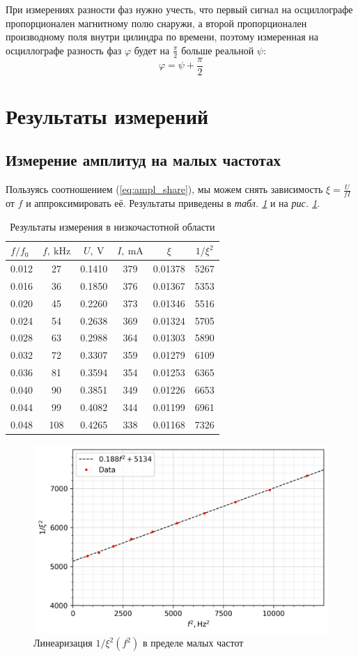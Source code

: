 \documentclass[12pt, a4paper]{article}
\newcommand{\V}{~\mathrm{V}}
\newcommand{\mA}{~\mathrm{mA}}
\newcommand{\kHz}{~\mathrm{kHz}}
\begin{document}
При измерениях разности фаз нужно учесть, что первый сигнал на осциллографе
пропорционален магнитному полю снаружи, а второй пропорционален производному
поля внутри цилиндра по времени, поэтому измеренная на осциллографе разность фаз $\varphi$ будет на $\frac{\pi}{2}$ больше реальной $\psi$:
\[\varphi = \psi + \frac{\pi}{2}\]



\section{Результаты измерений}
\subsection{Измерение амплитуд на малых частотах}
Пользуясь соотношением (\ref{eq:ampl_share}), мы можем снять зависимость $\xi = \frac{U}{fI}$ от $f$
и аппроксимировать её. Результаты приведены в \textit{табл. \ref{Table:low_freq}} и на \textit{рис. \ref{fig:low_freq}}.
\begin{table}[H]
  \begin{tabular}{|l|c|c|c|c|c|}
    \hline
    $f/f_0$ & $f, \kHz$ & $U, \V$ & $I, \mA$ & $\xi$ & $1/\xi^2$ \\
    \hline
    0.012 & 27 & 0.1410 & 379 & 0.01378 & 5267 \\
    0.016 & 36 & 0.1850 & 376 & 0.01367 & 5353 \\
    0.020 & 45 & 0.2260 & 373 & 0.01346 & 5516 \\
    0.024 & 54 & 0.2638 & 369 & 0.01324 & 5705 \\
    0.028 & 63 & 0.2988 & 364 & 0.01303 & 5890 \\
    0.032 & 72 & 0.3307 & 359 & 0.01279 & 6109 \\
    0.036 & 81 & 0.3594 & 354 & 0.01253 & 6365 \\
    0.040 & 90 & 0.3851 & 349 & 0.01226 & 6653 \\
    0.044 & 99 & 0.4082 & 344 & 0.01199 & 6961 \\
    0.048 & 108 & 0.4265 & 338 & 0.01168 & 7326 \\
    \hline
  \end{tabular}
  \caption{Результаты измерения в низкочастотной области}
  \label{Table:low_freq}
\end{table}

\begin{figure}[H]
  \centering
  \includegraphics[width=0.6\linewidth]{pics/res7.png}
  \caption{Линеаризация $1/\xi^2 (f^2)$ в пределе малых частот}
  \label{fig:low_freq}
\end{figure}
\end{document}

